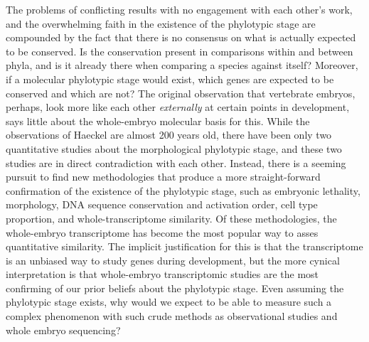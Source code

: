 The problems of conflicting results with no engagement with each other's work, and the overwhelming faith in the existence of the phylotypic stage are compounded by the fact that there is no consensus on what is actually expected to be conserved. Is the conservation present in comparisons within and between phyla, and is it already there when comparing a species against itself? Moreover, if a molecular phylotypic stage would exist, which genes are expected to be conserved and which are not? The original observation that vertebrate embryos, perhaps, look more like each other \textit{externally} at certain points in development, says little about the whole-embryo molecular basis for this. While the observations of Haeckel are almost 200 years old, there have been only two quantitative studies about the morphological phylotypic stage, and these two studies are in direct contradiction with each other. Instead, there is a seeming pursuit to find new methodologies that produce a more straight-forward confirmation of the existence of the phylotypic stage, such as embryonic lethality\cite{Uchida2018}, morphology\cite{OlafRP2003,Cordero2020}, DNA sequence conservation\cite{Piasecka2013,Quint2012,Liu2021} and activation order\cite{Uesaka2019}, cell type proportion\cite{Mayshar2023}, and whole-transcriptome similarity\cite{Piasecka2013,Irie2011,marletaz2018,Liu2020,Leong2021,PerezPosada2022,Kalinka2010}. Of these methodologies, the whole-embryo transcriptome has become the most popular way to asses quantitative similarity. The implicit justification for this is that the transcriptome is an unbiased way to study genes during development, but the more cynical interpretation is that whole-embryo transcriptomic studies are the most confirming of our prior beliefs about the phylotypic stage. Even assuming the phylotypic stage exists, why would we expect to be able to measure such a complex phenomenon with such crude methods as observational studies and whole embryo sequencing? 


